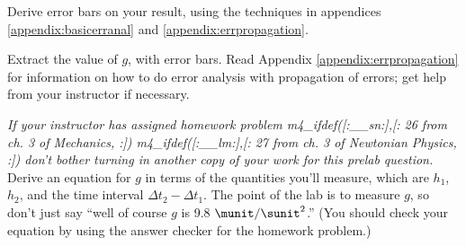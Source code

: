 Derive error bars on your result, using the techniques in appendices \ref{appendix:basicerranal}
and \ref{appendix:errpropagation}.

\selfcheck

Extract the value of $g$, with error bars.
Read Appendix \ref{appendix:errpropagation} for information on how to do error analysis
with propagation of errors; get help from your instructor if necessary.

\prelab

\prelabquestion  \emph{If your instructor has assigned homework problem 
m4_ifdef([:__sn:],[:%
26 from ch. 3 of Mechanics,%
:])%
m4_ifdef([:__lm:],[:%
27 from ch. 3 of Newtonian Physics,%
:])%
 don't bother turning in another copy of your work for this prelab
question.} Derive an equation for $g$ in terms of the
quantities you'll measure, which are $h_1$,
$h_2$, and the time interval $\Delta t_2-\Delta t_1$. The point of the lab
is to measure $g$, so don't just say ``well of course $g$ is
9.8 $\munit/\sunit^2$.'' (You should check your equation by using the answer
checker for the homework problem.)
